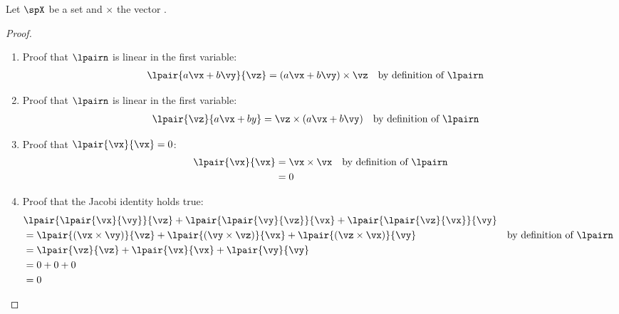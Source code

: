 \begin{example}
\label{ex:lie_cross}
Let $\spX$ be a set and $\times$ the vector .
\end{example}
\begin{proof}
\begin{enumerate}
  \item Proof that $\lpairn$ is linear in the first variable:
    \begin{align*}
      \lpair{a\vx+b\vy}{\vz}
        &= (a\vx+b\vy) \times \vz
        && \text{by definition of $\lpairn$}
    \end{align*}

  \item Proof that $\lpairn$ is linear in the first variable:
    \begin{align*}
      \lpair{\vz}{a\vx+by}
        &= \vz \times (a\vx+b\vy)
        && \text{by definition of $\lpairn$}
    \end{align*}

  \item Proof that $\lpair{\vx}{\vx}=0$:
    \begin{align*}
      \lpair{\vx}{\vx}
        &= \vx \times \vx
        && \text{by definition of $\lpairn$}
      \\&= 0
    \end{align*}

  \item Proof that the Jacobi identity holds true:
    \begin{align*}
      &\lpair{\lpair{\vx}{\vy}}{\vz} + \lpair{\lpair{\vy}{\vz}}{\vx} + \lpair{\lpair{\vz}{\vx}}{\vy}
      \\&= \lpair{(\vx\times\vy)}{\vz} + \lpair{(\vy\times\vz)}{\vx} + \lpair{(\vz\times\vx)}{\vy}
        && \text{by definition of $\lpairn$}
      \\&= \lpair{\vz}{\vz} + \lpair{\vx}{\vx} + \lpair{\vy}{\vy}
      \\&= 0 + 0 + 0
      \\&= 0
    \end{align*}
  \end{enumerate}

\end{proof}


